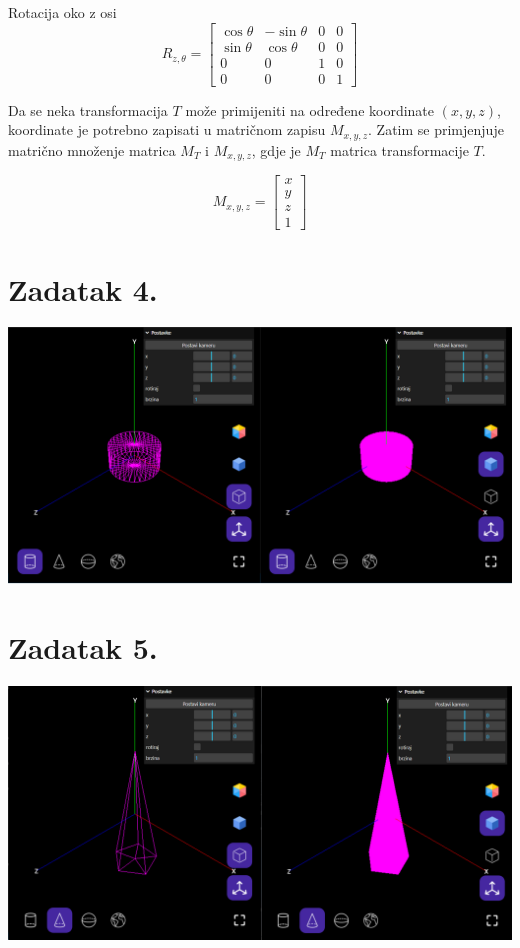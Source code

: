 \documentclass[a4paper,12pt]{article}
\begin{document}
Rotacija oko z osi
\[
R_{z,\theta}=
\begin{bmatrix}
    \cos{\theta} & -\sin{\theta} & 0 & 0 \\
    \sin{\theta} & \cos{\theta} & 0 & 0 \\
    0 & 0 & 1 & 0 \\
    0 & 0 & 0 & 1
\end{bmatrix}
\]

\pagebreak

Da se neka transformacija $T$ može primijeniti na određene koordinate $(x, y, z)$, koordinate je
potrebno zapisati u matričnom zapisu $M_{x,y,z}$. Zatim se primjenjuje matrično množenje
matrica $M_T$ i $M_{x,y,z}$, gdje je $M_T$ matrica transformacije $T$.

\[
M_{x,y,z}=
\begin{bmatrix}
    x \\
    y \\
    z \\
    1
\end{bmatrix}
\]
\pagebreak

\section{Zadatak 4.}

\includegraphics[scale=0.5]{image/zadatak4.png}

\pagebreak

\section{Zadatak 5.}

\includegraphics[scale=0.5]{image/zadatak5.png}
\end{document}
